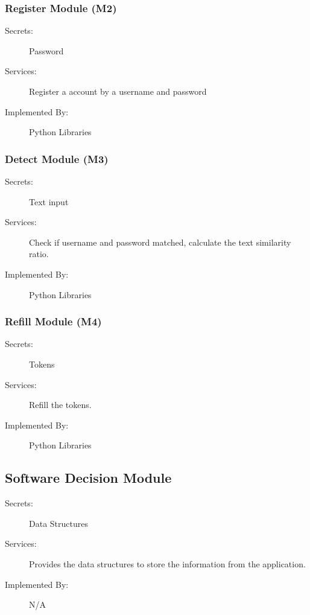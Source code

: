 \documentclass[12pt, titlepage]{article}
\begin{document}
\subsubsection{Register Module (M2)}

\begin{description}
\item[Secrets:]Password
\item[Services:]Register a account by a username and password
\item[Implemented By:] Python Libraries
\end{description}

\subsubsection{Detect Module (M3)}

\begin{description}
\item[Secrets:]Text input
\item[Services:]Check if username and password matched, calculate the text similarity ratio.
\item[Implemented By:] Python Libraries
\end{description}

\subsubsection{Refill Module (M4)}

\begin{description}
\item[Secrets:]Tokens
\item[Services:]Refill the tokens.
\item[Implemented By:] Python Libraries
\end{description}


\subsection{Software Decision Module}

\begin{description}
\item[Secrets:] Data Structures
\item[Services:] Provides the data structures to store the information from the application.
\item[Implemented By:] N/A
\end{description}
\end{document}
